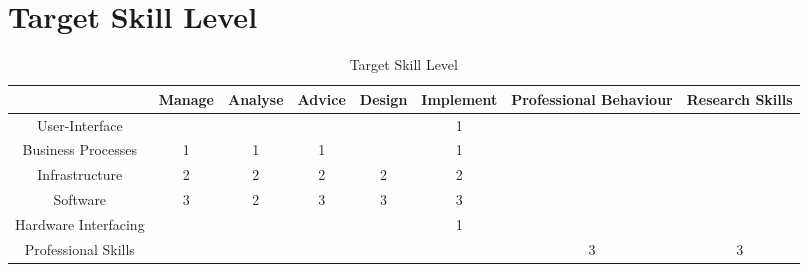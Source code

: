 
\section{Target Skill Level}
\label{sec:target}


\begin{table}[H]
	\centering
	\begin{tabular}{|c|c|c|c|c|c|c|c|}
		\hline
		& Manage & Analyse & Advice & Design & Implement & Professional Behaviour & Research Skills \\ \hline
		User-Interface & & & & & 1 & & \\ \hline
		Business Processes & 1 & 1 & 1 & & 1 & & \\ \hline
		Infrastructure & 2 & 2 & 2 & 2 & 2 & & \\ \hline
		Software & \cellcolor[HTML]{FD6864}3 & 2 & \cellcolor[HTML]{FD6864}3 & \cellcolor[HTML]{FD6864}3 & 3 & & \\ \hline
		Hardware Interfacing & & & & & 1 & & \\ \hline
		Professional Skills & & & & & & \cellcolor[HTML]{FD6864}3 &\cellcolor[HTML]{FD6864} 3 \\ \hline             
	\end{tabular}
	\caption{Target Skill Level}
	\label{targetskills}
\end{table}